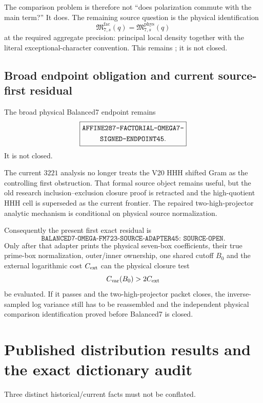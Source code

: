 \documentclass[11pt]{article}
\theoremstyle{definition}
\newcommand{\1}{\mathbf 1}
\begin{document}
The comparison problem is therefore not ``does polarization commute with the main term?''
It does.  The remaining source question is the physical identification
\[
\boxed{\mathfrak M^{\mathrm{fac}}_{7,s}(q)
=\mathfrak M^{\mathrm{phys}}_{7,s}(q)}
\]
at the required aggregate precision: principal local density together with the literal
exceptional-character convention.  This remains
; it is not closed.

\subsection{Broad endpoint obligation and current source-first residual}
\label{sec:factorial-endpoint}

The broad physical Balanced7 endpoint remains
\[
\boxed{\begin{gathered}
\text{\ttfamily AFFINE287-FACTORIAL-OMEGA7-}\\
\text{\ttfamily SIGNED-ENDPOINT45}.
\end{gathered}}
\]
It is not closed.

The current $3221$ analysis no longer treats the V20 HHH shifted Gram as the controlling
first obstruction.  That formal source object remains useful, but the old research
inclusion--exclusion closure proof is retracted and the high-quotient HHH cell is
superseded as the current frontier.  The repaired two-high-projector analytic mechanism is
conditional on physical source normalization.

Consequently the present first exact residual is
\[
\boxed{\texttt{BALANCED7-OMEGA-FM723-SOURCE-ADAPTER45: SOURCE-OPEN}.}
\]
Only after that adapter prints the physical seven-box coefficients, their true prime-box
normalization, outer/inner ownership, one shared cutoff $B_0$ and the external logarithmic
cost $C_{\rm ext}$ can the physical closure test
\[
C_{\rm var}(B_0)>2C_{\rm ext}
\]
be evaluated.  If it passes and the two-high-projector packet closes, the inverse-sampled
log variance still has to be reassembled and the independent physical comparison
identification proved before Balanced7 is closed.


\section{Published distribution results and the exact dictionary audit}

Three distinct historical/current facts must not be conflated.
\end{document}
